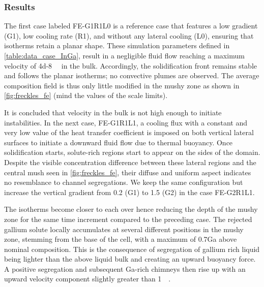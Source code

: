 \subsubsection{Results}

The first case labeled FE-G1R1L0 is a reference case that features a low gradient (G1), low cooling rate (R1), 
and without any lateral cooling (L0), ensuring that isotherms retain a planar shape. These simulation parameters 
defined in \cref{table:data_case_InGa}, result in a negligible fluid flow reaching a maximum velocity of \SI{4d-8}{\milli\uvelocity} in the bulk. 
Accordingly, the solidification front remains stable and follows the planar isotherms; no convective plumes are observed. 
The average composition field is thus only little modified in the mushy zone as shown in \cref{fig:freckles_fe} (mind the values of the scale limits). 

It is concluded that velocity in the bulk is not high enough to initiate instabilities. In the next case, FE-G1R1L1, 
a cooling flux with a constant and very low value of the heat transfer coefficient is imposed on both vertical lateral 
surfaces to initiate a downward fluid flow due to thermal buoyancy. Once solidification starts, solute-rich regions start 
to appear on the sides of the domain. Despite the visible concentration difference between these lateral regions and 
the central mush seen in \cref{fig:freckles_fe}, their diffuse and uniform aspect indicates no resemblance to channel segregations. We keep the 
same configuration but increase the vertical gradient from \SI{0.2}{\ugradT} (G1) to \SI{1.5}{\ugradT} (G2) in the case FE-G2R1L1. 

The isotherms become closer to each over hence reducing the depth of the mushy zone for the same time increment compared 
to the preceding case. The rejected gallium solute locally accumulates at several different positions in the mushy zone, 
stemming from the base of the cell, with a maximum of \SI{0.7}{\ucomposition}Ga above nominal composition. 
This is the consequence of segregation of gallium rich liquid being lighter than the above liquid bulk and creating an 
upward buoyancy force. A positive segregation and subsequent Ga-rich chimneys then rise up with an upward velocity 
component slightly greater than \SI{1}{\milli\uvelocity}.


